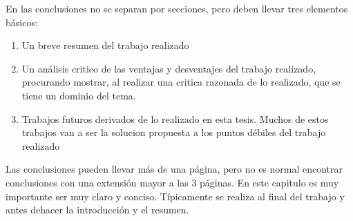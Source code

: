 En las conclusiones no se separan por secciones, pero deben llevar
tres elementos básicos:
\begin{enumerate}
  \item Un breve resumen del trabajo realizado
  \item Un análisis critico de las ventajas y desventajes del
  trabajo realizado, procurando mostrar, al realizar una critica
  razonada de lo realizado, que se tiene un dominio del tema.
  \item Trabajos futuros derivados de lo realizado en esta tesis.
  Muchos de estos trabajos van a ser la solucion propuesta a los
  puntos débiles del trabajo realizado
\end{enumerate}

Las conclusiones pueden llevar más de una página, pero no es normal
encontrar conclusiones con una extensión mayor a las 3 páginas. En
este capitulo es muy importante ser muy claro y conciso. Típicamente
se realiza al final del trabajo y antes dehacer la introducción y el
resumen.
